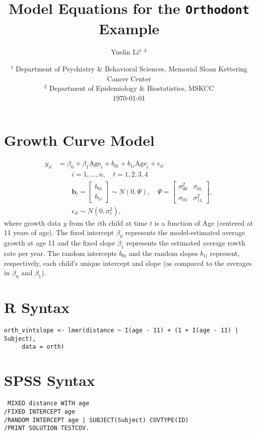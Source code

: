 \documentclass{article}
\title{Model Equations for the \texttt{Orthodont} Example}
\author{Yuelin Li$^1$ $^2$}
\date{%
    $^1$ Department of Psychiatry \& Behavioral
Sciences, Memorial Sloan Kettering Cancer Center
    \\%
    $^2$
    Department of Epidemiology \& Biostatistics, MSKCC
    \\[2ex]%
    \today
}
\begin{document}
\maketitle

\section{Growth Curve Model}

\begin{equation}
\begin{aligned}
        y_{it} &=
        \beta_{0} + \beta_{1} \mathrm{Age}_i + 
        b_{0i} + b_{1i} \mathrm{Age}_i + \epsilon_{it}  \\
        & \qquad 
        i = 1, \dots, n, \quad t = 1, 2, 3, 4 \\ 
        & \qquad \mathbf{b}_i  =  
                     \begin{bmatrix}
                     b_{0i}\\
                     b_{1i}
                    \end{bmatrix} \sim N(0, \Psi), \quad
      \Psi = \begin{bmatrix}
                 \sigma_{00}^2 & \sigma_{01} \\
                 \sigma_{01}     & \sigma_{11}^2 
                 \end{bmatrix},  \\
    & \qquad \epsilon_{it} \sim N(0, \sigma_{e}^2),
	\label{EQ:ORTH}
\end{aligned}
\end{equation}
where growth data $y$ from the $i$th child at time $t$ is a function of 
Age (centered at 11 years of age). The fixed intercept $\beta_0$ 
represents the model-estimated average growth at age 11 and
the fixed slope $\beta_1$ represents the estimated average rowth rate
per year. The random intercepts $b_{0i}$ and the
random slopes $b_{1i}$ represent, respectively, each child's unique
intercept and slope (as compared to the averages in $\beta_0$ and 
$\beta_1$).

\section{R Syntax}
\begin{verbatim}
orth_vintslope <- lmer(distance ~ I(age - 11) + (1 + I(age - 11) | Subject),
     data = orth)
\end{verbatim}

\section{SPSS Syntax}
\texttt{
MIXED distance WITH age  \\
/FIXED INTERCEPT age      \\
/RANDOM INTERCEPT age | SUBJECT(Subject) COVTYPE(ID)  \\
/PRINT SOLUTION TESTCOV.
}
\end{document}
